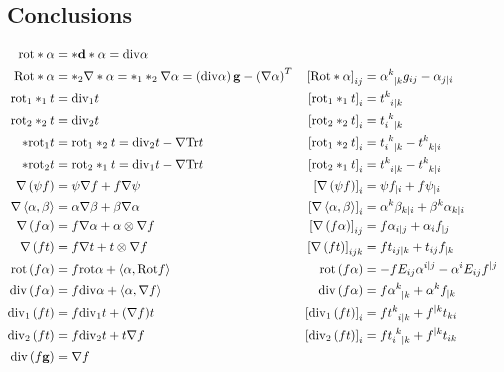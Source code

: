 \documentclass[a4paper,10pt]{scrartcl}
\newcommand{\exd}{\mathbf{d}}
\newcommand{\Tr}{\mathrm{Tr}}
\newcommand{\rot}{\mathrm{rot}}
\renewcommand{\div}{\mathrm{div}}
\newcommand{\Rot}{\mathrm{Rot}}
\newcommand{\gb}{\mathbf{g}}
\begin{document}
  \subsection{Conclusions}
  \begin{align*}
    \rot*\alpha &= *\exd*\alpha = \div\alpha\\
    \Rot*\alpha &= *_{2}\nabla*\alpha = *_{1}*_{2}\nabla\alpha = \left( \div\alpha \right)\gb - \left( \nabla\alpha \right)^{T}
                & \left[ \Rot*\alpha  \right]_{ij} &= \tensor{\alpha}{^{k}_{|k}}g_{ij} - \alpha_{j|i}\\
    \rot_{1}*_{1}t &= \div_{1} t
                &\left[ \rot_{1}*_{1}t \right]_{i} &= \tensor{t}{^{k}_{i|k}}\\
    \rot_{2}*_{2}t &= \div_{2} t
                &\left[ \rot_{2}*_{2}t \right]_{i} &= \tensor{t}{_{i}^{k}_{|k}}\\
    *\rot_{1} t &= \rot_{1}*_{2}t = \div_{2} t - \nabla\Tr t
                &\left[ \rot_{1}*_{2}t \right]_{i} &= \tensor{t}{_{i}^{k}_{|k}} - \tensor{t}{^{k}_{k|i}}\\
    *\rot_{2} t &= \rot_{2}*_{1}t = \div_{1} t - \nabla\Tr t
                &\left[ \rot_{2}*_{1}t \right]_{i} &= \tensor{t}{^{k}_{i|k}} - \tensor{t}{^{k}_{k|i}}\\
    \nabla\left( \psi f \right) &= \psi\nabla f + f\nabla\psi
                &\left[ \nabla\left( \psi f \right) \right]_{i} &= \psi f_{|i} + f \psi_{|i}\\
    \nabla\left\langle \alpha, \beta \right\rangle &= \alpha\nabla\beta + \beta\nabla\alpha
                &\left[ \nabla\left\langle \alpha, \beta \right\rangle \right]_{i} &= \alpha^{k}\beta_{k|i} + \beta^{k}\alpha_{k|i}\\
    \nabla\left( f\alpha \right) &= f\nabla\alpha + \alpha\otimes\nabla f
                &\left[ \nabla\left( f\alpha \right) \right]_{ij} &= f\alpha_{i|j} + \alpha_{i}f_{|j}\\
    \nabla\left( f t \right) &= f\nabla t + t \otimes\nabla f
                &\left[ \nabla\left( f t \right) \right]_{ijk} &= f t_{ij|k} + t_{ij}f_{|k}\\
    \rot\left( f\alpha \right) &= f\rot\alpha + \left\langle \alpha, \Rot f \right\rangle
                &\rot\left( f\alpha \right) &= -fE_{ij}\alpha^{i|j} - \alpha^{i}E_{ij}f^{|j}\\
    \div\left( f\alpha \right) &= f\div\alpha + \left\langle \alpha, \nabla f \right\rangle
                &\div\left( f\alpha \right) &= f\tensor{\alpha}{^{k}_{|k}} + \alpha^{k}f_{|k}\\
    \div_{1}\left( f t \right) &= f\div_{1}t + (\nabla f)t
                &\left[  \div_{1}\left( f t \right) \right]_{i} &= f\tensor{t}{^{k}_{i|k}} + f^{|k}t_{ki}\\
    \div_{2}\left( f t \right) &= f\div_{2}t + t\nabla f
                &\left[  \div_{2}\left( f t \right) \right]_{i} &= f\tensor{t}{_{i}^{k}_{|k}} + f^{|k}t_{ik}\\
    \div\left( f \gb \right) &= \nabla f
  \end{align*}
\end{document}
